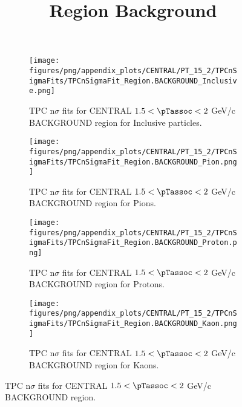             \begin{figure}[H]
                \title{Region Background}
                \begin{subfigure}[b]{0.5\textwidth}
                    \centering
                    \texttt{[image: figures/png/appendix\_plots/CENTRAL/PT\_15\_2/TPCnSigmaFits/TPCnSigmaFit\_Region.BACKGROUND\_Inclusive.png]}
                    \caption{TPC n$\sigma$ fits for CENTRAL $1.5 < \pTassoc < 2$ GeV/c BACKGROUND region for Inclusive particles.}
                    \label{fig:appendix_CENTRAL_$1.5 < \pTassoc < 2$ GeV/c_BACKGROUND_Inclusive}
                \end{subfigure}
                \begin{subfigure}[b]{0.5\textwidth}
                    \centering
                    \texttt{[image: figures/png/appendix\_plots/CENTRAL/PT\_15\_2/TPCnSigmaFits/TPCnSigmaFit\_Region.BACKGROUND\_Pion.png]}
                    \caption{TPC n$\sigma$ fits for CENTRAL $1.5 < \pTassoc < 2$ GeV/c BACKGROUND region for Pions.}
                    \label{fig:appendix_CENTRAL_$1.5 < \pTassoc < 2$ GeV/c_BACKGROUND_Pion}
                \end{subfigure}
                \begin{subfigure}[b]{0.5\textwidth}
                    \centering
                    \texttt{[image: figures/png/appendix\_plots/CENTRAL/PT\_15\_2/TPCnSigmaFits/TPCnSigmaFit\_Region.BACKGROUND\_Proton.png]}
                    \caption{TPC n$\sigma$ fits for CENTRAL $1.5 < \pTassoc < 2$ GeV/c BACKGROUND region for Protons.}
                    \label{fig:appendix_CENTRAL_$1.5 < \pTassoc < 2$ GeV/c_BACKGROUND_Proton}
                \end{subfigure}
                \begin{subfigure}[b]{0.5\textwidth}
                    \centering
                    \texttt{[image: figures/png/appendix\_plots/CENTRAL/PT\_15\_2/TPCnSigmaFits/TPCnSigmaFit\_Region.BACKGROUND\_Kaon.png]}
                    \caption{TPC n$\sigma$ fits for CENTRAL $1.5 < \pTassoc < 2$ GeV/c BACKGROUND region for Kaons.}
                    \label{fig:appendix_CENTRAL_$1.5 < \pTassoc < 2$ GeV/c_BACKGROUND_Kaon}
                \end{subfigure}
                \caption{TPC n$\sigma$ fits for CENTRAL $1.5 < \pTassoc < 2$ GeV/c BACKGROUND region.}
                \label{fig:appendix_CENTRAL_$1.5 < \pTassoc < 2$ GeV/c_BACKGROUND}
            \end{figure}
            \clearpage
            
